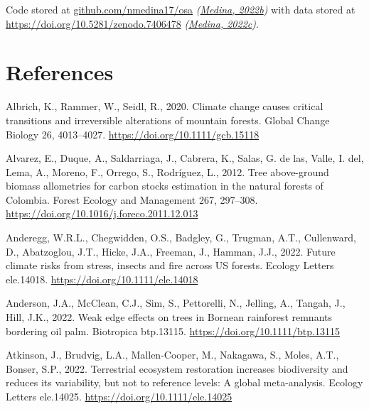 \documentclass[
  12pt,
]{article}
\newlength{\cslhangindent}
\newlength{\cslentryspacingunit} %
\newenvironment{CSLReferences}[2] %
 {%
  \setlength{\parindent}{0pt}
  \ifodd #1
  \let\oldpar\par
  \def\par{\hangindent=\cslhangindent\oldpar}
  \fi
  \setlength{\parskip}{#2\cslentryspacingunit}
 }%
 {}
\begin{document}
Code stored at \href{github.com/nmedin17/osa}{github.com/nmedina17/osa} \emph{(\protect\hyperlink{ref-softwareMedina22osa}{Medina, 2022b})} with data stored at \url{https://doi.org/10.5281/zenodo.7406478} \emph{(\protect\hyperlink{ref-medina22osaDataRaw}{Medina, 2022c})}.

\newpage

\hypertarget{references}{%
\section*{References}\label{references}}

\hypertarget{refs}{}
\begin{CSLReferences}{1}{0}
\leavevmode{}%
Albrich, K., Rammer, W., Seidl, R., 2020. Climate change causes critical transitions and irreversible alterations of mountain forests. Global Change Biology 26, 4013--4027. \url{https://doi.org/10.1111/gcb.15118}

\leavevmode{}%
Alvarez, E., Duque, A., Saldarriaga, J., Cabrera, K., Salas, G. de las, Valle, I. del, Lema, A., Moreno, F., Orrego, S., Rodríguez, L., 2012. Tree above-ground biomass allometries for carbon stocks estimation in the natural forests of {Colombia}. Forest Ecology and Management 267, 297--308. \url{https://doi.org/10.1016/j.foreco.2011.12.013}

\leavevmode{}%
Anderegg, W.R.L., Chegwidden, O.S., Badgley, G., Trugman, A.T., Cullenward, D., Abatzoglou, J.T., Hicke, J.A., Freeman, J., Hamman, J.J., 2022. Future climate risks from stress, insects and fire across {US} forests. Ecology Letters ele.14018. \url{https://doi.org/10.1111/ele.14018}

\leavevmode{}%
Anderson, J.A., McClean, C.J., Sim, S., Pettorelli, N., Jelling, A., Tangah, J., Hill, J.K., 2022. Weak edge effects on trees in {Bornean} rainforest remnants bordering oil palm. Biotropica btp.13115. \url{https://doi.org/10.1111/btp.13115}

\leavevmode{}%
Atkinson, J., Brudvig, L.A., Mallen-Cooper, M., Nakagawa, S., Moles, A.T., Bonser, S.P., 2022. Terrestrial ecosystem restoration increases biodiversity and reduces its variability, but not to reference levels: {A} global meta-analysis. Ecology Letters ele.14025. \url{https://doi.org/10.1111/ele.14025}


\end{CSLReferences}
\end{document}
